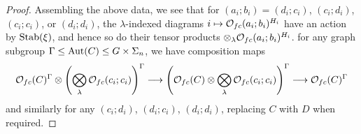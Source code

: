 \documentclass[a4paper,10pt
,draft
]{article}%
\renewcommand{\1}{\eta}%
\begin{document}
\begin{proof}
      Assembling the above data, 
      we see that for $(a_i;b_i) = (d_i;c_i)$, $(c_i;d_i)$, $(c_i;c_i)$, or $(d_i;d_i)$,
      the $\lambda$-indexed diagrams $i \mapsto \mathcal{O}_{f c}(a_i;b_i)^{H_i}$
      have an action by $\mathrm{Stab}(\xi)$,
      and hence so do their tensor products $\otimes_\lambda \mathcal{O}_{f c}(a_i;b_i)^{H_i}$.
      for any graph subgroup $\Gamma \leq \operatorname{Aut}(C) \leq G \times \Sigma_n$,
      we have composition maps
      \begin{equation}
            \mathcal{O}_{f c}(C)^{\Gamma} \otimes \left(
                  \bigotimes\limits_\lambda \mathcal{O}_{f c}(c_i;c_i)
            \right)^{\Gamma}
            \longrightarrow
            \left(
                  \mathcal{O}_{f c}(C) \otimes \bigotimes\limits_\lambda \mathcal{O}_{f c}(c_i;c_i)
            \right)^\Gamma
            \longrightarrow
            \mathcal{O}_{f c}(C)^\Gamma
      \end{equation}
      and similarly for any $(c_i;d_i)$, $(d_i;c_i)$, $(d_i;d_i)$,
      replacing $C$ with $D$ when required.
      

\end{proof}
\end{document}
